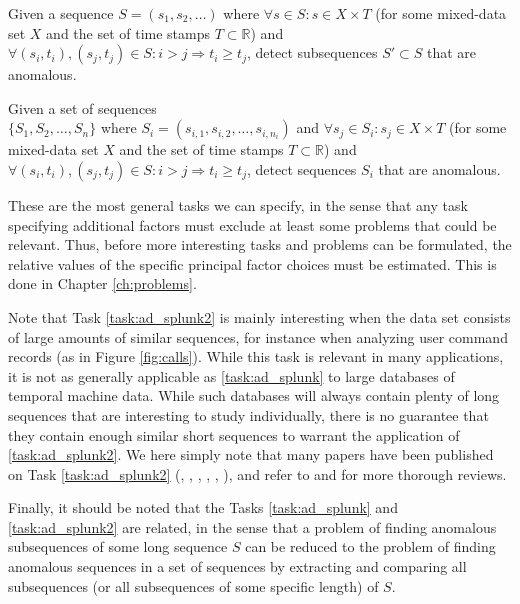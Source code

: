 \begin{task}
  \label{task:ad_splunk}
  Given a sequence $S = (s_1, s_2, \dots)$ where $\forall s \in S: s \in X \times T$ (for some mixed-data set $X$ and the set of time stamps $T \subset \mathbb{R}$) and $\forall (s_i, t_i), (s_j, t_j) \in S: i > j \Rightarrow t_i \geq t_j$, detect subsequences $S' \subset S$ that are anomalous. 
\end{task}
\begin{task}
  \label{task:ad_splunk2}
  Given a set of sequences\\ $\{S_1, S_2, \dots, S_n\}$ where $S_i = (s_{i,1}, s_{i,2}, \dots, s_{i, n_i})$ and $\forall s_j \in S_i: s_j \in X \times T$ (for some mixed-data set $X$ and the set of time stamps $T \subset \mathbb{R}$) and $\forall (s_i, t_i), (s_j, t_j) \in S: i > j \Rightarrow t_i \geq t_j$, detect sequences $S_i$ that are anomalous.
\end{task}

These are the most general tasks we can specify, in the sense that any task specifying additional factors must exclude at least some problems that could be relevant. Thus, before more interesting tasks and problems can be formulated, the relative values of the specific principal factor choices must be estimated. This is done in Chapter \ref{ch:problems}.

Note that Task \ref{task:ad_splunk2} is mainly interesting when the data set consists of large amounts of similar sequences, for instance when analyzing user command records (as in Figure \ref{fig:calls}). While this task is relevant in many applications, it is not as generally applicable as \ref{task:ad_splunk} to large databases of temporal machine data. While such databases will always contain plenty of long sequences that are interesting to study individually, there is no guarantee that they contain enough similar short sequences to warrant the application of \ref{task:ad_splunk2}. We here simply note that many papers have been published on Task \ref{task:ad_splunk2} (\cite{blender}, \cite{chan}, \cite{ye}, \cite{forrest}, \cite{sekar1}, \cite{sekar2}), and refer to \cite{chandola2} and \cite{chandola3} for more thorough reviews.

Finally, it should be noted that the Tasks \ref{task:ad_splunk} and \ref{task:ad_splunk2} are related, in the sense that a problem of finding anomalous subsequences of some long sequence $S$ can be reduced to the problem of finding anomalous sequences in a set of sequences by extracting and comparing all subsequences (or all subsequences of some specific length) of $S$.


